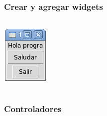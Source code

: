 \documentclass[12pt]{beamer}
\begin{document}
  \begin{frame}
    \frametitle{Crear y agregar widgets}
    \begin{columns}[B]
        \footnotesize
        
        \vfill
        \includegraphics[width=\textwidth]{programas/tkinter/capturas/04.png}
    \end{columns}
  \end{frame}

  \begin{frame}
    \frametitle{Controladores}
    \footnotesize
    
  \end{frame}
\end{document}
